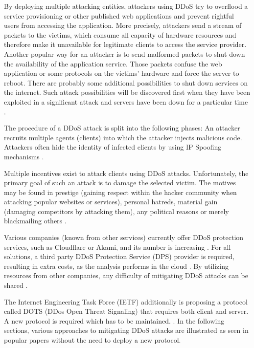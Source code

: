 By deploying multiple attacking entities, attackers using DDoS try to overflood a service provisioning or other published web applications and prevent rightful users from accessing the application. More precisely, attackers send a stream of packets to the victims, which consume all capacity of hardware resources and therefore make it unavailable for legitimate clients to access the service provider. Another popular way for an attacker is to send malformed packets to shut down the availability of the application service. Those packets confuse the web application or some protocols on the victims' hardware and force the server to reboot. There are probably some additional possibilities to shut down services on the internet. Such attack possibilities will be discovered first when they have been exploited in a significant attack and servers have been down for a particular time \cite{Mirkovic2004}.

The procedure of a DDoS attack is split into the following phases: An attacker recruits multiple agents (clients) into which the attacker injects malicious code. Attackers often hide the identity of infected clients by using IP Spoofing mechanisms \cite{Mirkovic2004}.


Multiple incentives exist to attack clients using DDoS attacks. Unfortunately, the primary goal of such an attack is to damage the selected victim. The motives may be found in prestige (gaining respect within the hacker community when attacking popular websites or services), personal hatreds, material gain (damaging competitors by attacking them), any political reasons or merely blackmailing others \cite{Mansfield-Devine2015, Mirkovic2004}.


Various companies (known from other services) currently offer DDoS protection services, such as Cloudflare or Akami, and its number is increasing \cite{Pras2016}. For all solutions, a third party DDoS Protection Service (DPS) provider is required, resulting in extra costs, as the analysis performs in the cloud \cite{Rodrigues2017}. By utilizing resources from other companies, any difficulty of mitigating DDoS attacks can be shared \cite{Rodrigues2017}.

The Internet Engineering Task Force (IETF) additionally is proposing a protocol called DOTS (DDos Open Threat Signaling) that requires both client and server. A new protocol is required which has to be maintained.  \cite{Rodrigues2017a}. In the following sections, various approaches to mitigating DDoS attacks are illustrated as seen in popular papers without the need to deploy a new protocol.

